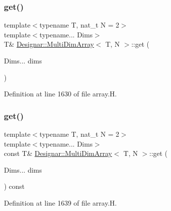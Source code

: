 \subsubsection{\texorpdfstring{get()}{get()}\hspace{0.1cm}{\footnotesize\ttfamily [1/2]}}
{\footnotesize\ttfamily template$<$typename T, nat\+\_\+t N = 2$>$ \\
template$<$typename... Dims$>$ \\
T\& \hyperlink{class_designar_1_1_multi_dim_array}{Designar\+::\+Multi\+Dim\+Array}$<$ T, N $>$\+::get (\begin{DoxyParamCaption}\item[{Dims...}]{dims }\end{DoxyParamCaption})\hspace{0.3cm}{\ttfamily [inline]}}



Definition at line 1630 of file array.\+H.

\mbox{\label{class_designar_1_1_multi_dim_array_a36ba716b359942501b9cd6d96562e774}} 
\subsubsection{\texorpdfstring{get()}{get()}\hspace{0.1cm}{\footnotesize\ttfamily [2/2]}}
{\footnotesize\ttfamily template$<$typename T, nat\+\_\+t N = 2$>$ \\
template$<$typename... Dims$>$ \\
const T\& \hyperlink{class_designar_1_1_multi_dim_array}{Designar\+::\+Multi\+Dim\+Array}$<$ T, N $>$\+::get (\begin{DoxyParamCaption}\item[{Dims...}]{dims }\end{DoxyParamCaption}) const\hspace{0.3cm}{\ttfamily [inline]}}



Definition at line 1639 of file array.\+H.

\mbox{\label{class_designar_1_1_multi_dim_array_a9547e76013b4f532de026ec425ad4f7a}} 
